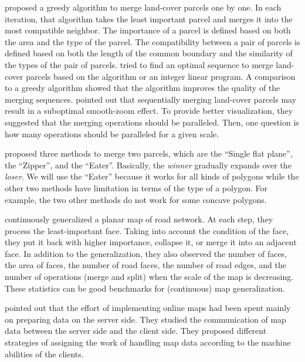 \documentclass[ijgi,article,submit,moreauthors,pdftex]{Definitions/mdpi}
\begin{document}
\citet{vanOosterom2005} proposed a greedy algorithm 
to merge land-cover parcels one by one.
In each iteration, that algorithm takes the least important parcel and 
merges it into the most compatible neighbor.
The importance of a parcel is defined 
based on both the area and the type of the parcel.
The compatibility between a pair of parcels is defined based on 
both the length of the common boundary and the similarity of the types 
of the pair of parcels. 
\citet[]{Peng2019Thesis} tried to find an optimal sequence 
to merge land-cover parcels
based on the \Astar algorithm or an integer linear program.
A comparison to a greedy algorithm showed that 
the \Astar algorithm improves the quality of the merging sequences.
\citet{vanOosterom2014Support} pointed out that sequentially merging
land-cover parcels may result in a suboptimal smooth-zoom effect.
To provide better visualization, they suggested that
the merging operations should be paralleled.
Then, one question is how many operations 
should be paralleled for a given scale.

\citet{Suba2014Merge} proposed three methods to merge two parcels, 
which are the ``Single flat plane'', the ``Zipper'', and the ``Eater''.
Basically, the \emph{winner} gradually expands over the \emph{loser}.
We will use the ``Eater'' because it works for all kinds of polygons 
while the other two methods have limitation in terms of the type of a polygon.
For example, the two other methods do not work for some concave polygons.



\citet{Suba2016Road} continuously generalized a planar map of road network.
At each step, they process the least-important face.
Taking into account the condition of the face,
they put it back with higher importance, collapse it, 
or merge it into an adjacent face.
In addition to the generalization, 
they also observed the number of faces,
the area of faces, the number of road faces, the number of road edges,
and the number of operations (merge and split) 
when the scale of the map is decreasing.
These statistics can be good benchmarks for (continuous) map generalization.



\citet{Huang2016Webmap} pointed out that
the effort of implementing online maps 
had been spent mainly on preparing data on the server side.
They studied the communication of map data 
between the server side and the client side.
They proposed different strategies of assigning 
the work of handling map data
according to the machine abilities of the clients.
\end{document}
